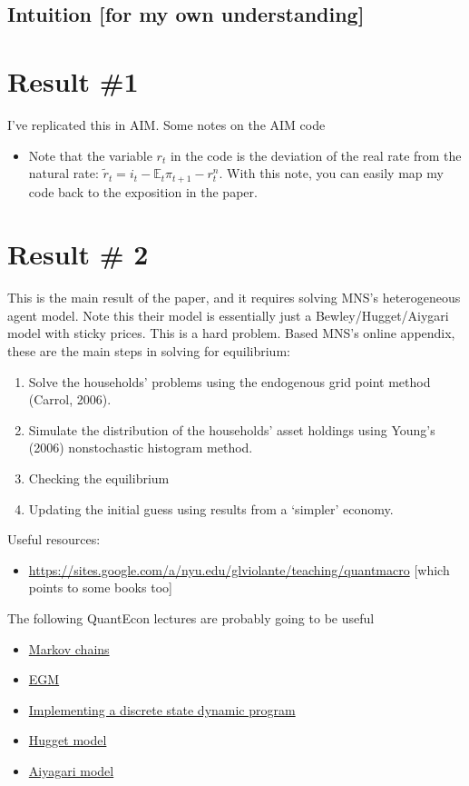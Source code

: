 \documentclass[12pt]{article}
\newcommand{\E}{\mathbb{E}}
\begin{document}
\subsection{Intuition [for my own understanding]}

\section{Result \#1}
I've replicated this in AIM. Some notes on the AIM code
\begin{itemize}
\item Note that the variable $r_t$ in the code is the deviation of the real rate from the natural rate: $\tilde r_t = i_t -\E_t\pi_{t+1} - r^n_t$. With this note, you can easily map my code back to the exposition in the paper.
\end{itemize}

\section{Result \# 2}
This is the main result of the paper, and it requires solving MNS's heterogeneous agent model. Note this their model is essentially just a Bewley/Hugget/Aiygari model with sticky prices. This is a hard problem. Based MNS's online appendix, these are the main steps in solving for equilibrium:

\begin{enumerate}
\item Solve the households' problems using the endogenous grid point method (Carrol, 2006).
\item Simulate the distribution of the households' asset holdings using Young's (2006) nonstochastic histogram method.
\item Checking the equilibrium
\item Updating the initial guess using results from a `simpler' economy.
\end{enumerate}



Useful resources:
\begin{itemize}
\item \url{https://sites.google.com/a/nyu.edu/glviolante/teaching/quantmacro} [which points to some books too]
\end{itemize}
The following QuantEcon lectures are probably going to be useful
\begin{itemize}
\item \href{https://lectures.quantecon.org/jl/finite_markov.html}{Markov chains}
\item \href{https://lectures.quantecon.org/jl/egm_policy_iter.html}{EGM}
\item \href{https://lectures.quantecon.org/jl/discrete_dp.html}{Implementing a discrete state dynamic program}
\item \href{https://lectures.quantecon.org/jl/ifp.html}{Hugget model}
\item \href{https://lectures.quantecon.org/jl/aiyagari.html}{Aiyagari model}
\end{itemize}
\end{document}
